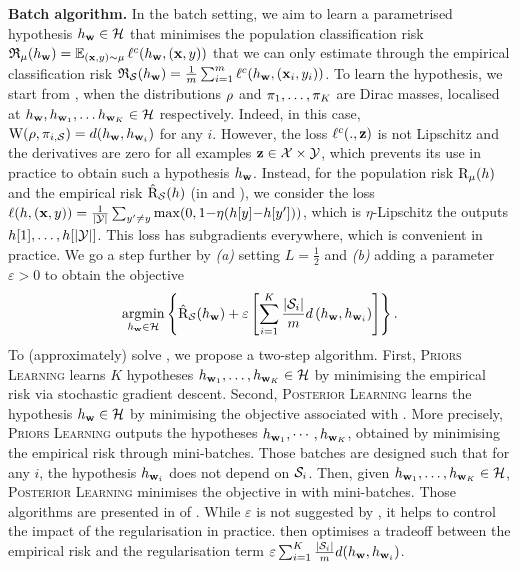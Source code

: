 \documentclass{article}
\begin{document}
\textbf{Batch algorithm.} In the batch setting, we aim to learn a parametrised hypothesis $h_{\wbf}\in\H$ that minimises the population classification risk $\Rfrak_{\D}(h_{\wbf}) = \EE_{(\x, y)\sim\D}\loss^{c}(h_{\wbf}, (\x, y))$ that we can only estimate through the empirical classification risk $\Rfrak_{\S}(h_{\wbf}) = \frac{1}{m}\sum_{i=1}^{m}\loss^{c}(h_{\wbf}, (\x_i, y_i))$.
To learn the hypothesis, we start from , when the distributions $\Q$ and $\P_1,\dots, \P_K$ are Dirac masses, localised at $h_{\wbf}, h_{\wbf_1},\dots h_{\wbf_K}\in\H$ respectively.
Indeed, in this case, $\W(\Q, \P_{i,\S}) = d(h_{\wbf}, h_{\wbf_i})$ for any $i$.
However, the loss $\loss^{c}(.,\z)$ is not Lipschitz and the derivatives are zero for all examples $\z\in\X\times\Y$, which prevents its use in practice to obtain such a hypothesis $h_{\wbf}$.
Instead, for the population risk $\Risk_{\D}(h)$ and the empirical risk $\Riskhat_{\S}(h)$ (in  and ), we consider the loss $\loss(h, (\x, y)) = \frac{1}{|\Y|}\sum_{y'\ne y} \max(0, 1{-} \eta(h[y]{-}h[y']))$, which is $\eta$-Lipschitz \wrt the outputs $h[1],\dots, h[|\Y|]$.
This loss has subgradients everywhere, which is convenient in practice.
We go a step further by {\it (a)}  setting $L=\frac{1}{2}$ and {\it (b)} adding a parameter $\varepsilon>0$ to obtain the objective
\begin{align}
    \label{eq:batch-alg-exp}
    \argmin_{h_{\wbf}\in\H}\LC \Riskhat_{\S}(h_{\wbf}) + \varepsilon\LB\sum_{i=1}^{K} \frac{|\S_i|}{m} d\LP h_\wbf,h_{\wbf_i}\RP\RB\RC.
\end{align}
To (approximately) solve , we propose a two-step algorithm.
First, \textsc{Priors Learning} learns $K$ hypotheses $h_{\wbf_1}, \dots, h_{\wbf_K} \in \H$ by minimising the empirical risk via stochastic gradient descent.
Second, \textsc{Posterior Learning} learns the hypothesis $h_{\wbf}\in\H$ by minimising the objective associated with .
More precisely, \textsc{Priors Learning} outputs the hypotheses $h_{\wbf_1},\cdots,h_{\wbf_K}$, obtained by minimising the empirical risk through mini-batches.
Those batches are designed such that for any $i$, the hypothesis $h_{\wbf_i}$ does not depend on $\S_i$.
Then, given $h_{\wbf_1}, \dots, h_{\wbf_K} \in \H$, \textsc{Posterior Learning} minimises the objective in  with mini-batches.
Those algorithms are presented in  of .
While $\varepsilon$ is not suggested by , it helps to control the impact of the regularisation in practice.
 then optimises a tradeoff between the empirical risk and the regularisation term $\varepsilon\sum_{i=1}^{K} \frac{|\S_i|}{m} d(h_{\wbf}, h_{\wbf_i})$.
\end{document}
